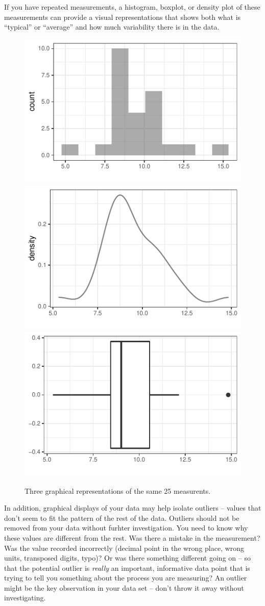 \documentclass[twoside]{book}\usepackage[]{graphicx}\usepackage[]{xcolor}
\newenvironment{knitrout}{}{} %
\begin{document}
If you have repeated measurements, a histogram, boxplot, or density plot of these 
measurements can provide a 
visual representations that shows both what is ``typical'' or ``average'' and how much 
variability there is in the data.  

\begin{figure}[h]
\begin{knitrout}
\color{fgcolor}

{\centering \includegraphics[width=.3\textwidth]{figures/fig-variability-1} 
\includegraphics[width=.3\textwidth]{figures/fig-variability-2} 
\includegraphics[width=.3\textwidth]{figures/fig-variability-3} 

}



\end{knitrout}
\caption{Three graphical representations of the same 25 measurents.}
\end{figure}


In addition, graphical displays of your data may help isolate outliers -- values
that don't seem to fit the pattern of the rest of the data.  Outliers should not be removed
from your data without furhter investigation.  You need to know why these values are 
different from the rest.  Was there a mistake in the measurement?  Was the value recorded
incorrectly (decimal point in the wrong place, wrong units, transposed digits, typo)?
Or was there something different going on -- so that the potential outlier is \emph{really} an important, informative data point that is trying to tell you something about the process you are measuring?  An outlier might be the key observation in 
your data set -- don't throw it away without investigating.
\end{document}
